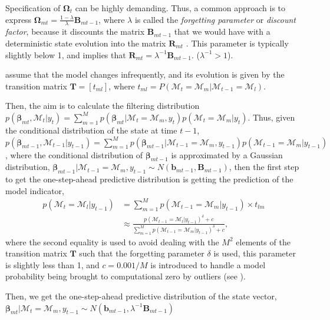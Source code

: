 Specification of $\bm{\Omega}_t$ can be highly demanding. Thus, a common approach is to express $\bm{\Omega}_{mt}=\frac{1-\lambda}{\lambda}\bm{B}_{mt-1}$, where $\lambda$ is called the \textit{forgetting parameter} or \textit{discount factor}, because it discounts the matrix $\bm{B}_{mt-1}$ that we would have with a deterministic state evolution into the matrix $\bm{R}_{mt}$ \cite[Chap.~4]{petris2009dynamic}. This parameter is typically slightly below 1, and implies that $\bm{R}_{mt}=\lambda^{-1}\bm{B}_{mt-1}$. ($\lambda^{-1}>1$).

\cite{raftery2010online} assume that the model changes infrequently, and its evolution is given by the transition matrix $\bm{T}=[t_{ml}]$, where $t_{ml}=P(\mathcal{M}_t=\mathcal{M}_m|\mathcal{M}_{t-1}=\mathcal{M}_l)$.

Then, the aim is to calculate the filtering distribution $p(\bm{\beta}_{mt},\mathcal{M}_t|y_t)=\sum_{m=1}^Mp(\bm{\beta}_{mt}|\mathcal{M}_t=\mathcal{M}_m,y_t)p(\mathcal{M}_t=\mathcal{M}_m|y_t)$. Thus, given the conditional distribution of the state at time $t-1$, $p(\bm{\beta}_{mt-1},\mathcal{M}_{t-1}|{y}_{t-1})=\sum_{m=1}^Mp(\bm{\beta}_{mt-1}|\mathcal{M}_{t-1}=\mathcal{M}_m,{y}_{t-1})p(\mathcal{M}_{t-1}=\mathcal{M}_m|{y}_{t-1})$, where the conditional distribution of $\bm{\beta}_{mt-1}$ is approximated by a Gaussian distribution, $\bm{\beta}_{mt-1}|\mathcal{M}_{t-1}=\mathcal{M}_{m},y_{t-1}\sim N(\bm{b}_{mt-1},\bm{B}_{mt-1})$, then the first step to get the one-step-ahead predictive distribution is getting the prediction of the model indicator, 
\begin{align*}
	p(\mathcal{M}_t=\mathcal{M}_l|y_{t-1})&=\sum_{m=1}^M p(\mathcal{M}_{t-1}=\mathcal{M}_m|y_{t-1})\times t_{lm}\\
	&\approx \frac{p(\mathcal{M}_{t-1}=\mathcal{M}_l|y_{t-1})^{\delta}+c}{\sum_{m=1}^M p(\mathcal{M}_{t-1}=\mathcal{M}_m|y_{t-1})^{\delta}+c},  
\end{align*}
where the second equality is used to avoid dealing with the $M^2$ elements of the transition matrix $\bm{T}$ such that the forgetting parameter $\delta$ is used, this parameter is slightly less than 1, and $c=0.001/M$ is introduced to handle a model probability being brought to computational zero by outliers (see \cite{raftery2010online}).

Then, we get the one-step-ahead predictive distribution of the state vector, $\bm{\beta}_{mt}|\mathcal{M}_{t}=\mathcal{M}_{m},y_{t-1}\sim N(\bm{b}_{mt-1},\lambda^{-1}\bm{B}_{mt-1})$ 

